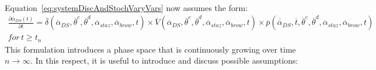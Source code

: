 \\Equation~\ref{eq:systemDiscAndStochVaryVars} now assumes the form:
\begin{equation}
\label{eq:systemDiscAndStochVaryVarsExpanded}
\begin{matrix}
\frac{\partial  \overline{\alpha }_{DS}\left ( t \right )}{\partial t}=  \overline{\delta}\left ( \overline{\alpha }_{DS}, \overline{\theta}^{c},\overline{\theta}^{d},\overline{\alpha}_{staz},\overline{\alpha}_{brow},t \right ) \times \overline{V}\left ( \overline{\alpha }_{DS}, \overline{\theta}^{c},\overline{\theta}^{d},\overline{\alpha}_{staz},\overline{\alpha}_{brow},t \right ) \times \overline{p}\left ( \overline{\overline{\alpha}}_{DS},\overline{t},\overline{\theta}^{c},\overline{\theta}^{d},\overline{\alpha}_{staz},\overline{\alpha}_{brow},t  \right ) \\ \! \! \! \! \! \! \! \! \! \! \! \! \! \! \! \! \! \! \! \! \! \! \! \! \! \! \! \! \! \! \! \! \! \! \! \! \! \! \! \! \! \! \! \! \! \! \! \! \! \! \! \! \! \! \! \! \! \! \! \! \! \! \! \! \! \! \! \! \! \! \! \! \! \! \! \! \! \! \! \! \! \! \! \! \! \! \! \! \! \! \! \! \! \! \! \! \! \! \! \! \! \! \! \! \! \! \! \! \! \! \! \! \! \! \! \! \! \! \! \! \! \! \! \! \! \! \! \! \! \! \! \! \! \! \! \! \! \! \! \! \! \! \! \! \! \! \! \! \! \! \! \! \! \! \! \! \! \! \! \! \! \! \! \! \! \! \! \!
for \, t\geq t_{n}
\end{matrix}
\end{equation}
This formulation introduces a phase space that is continuously growing over time $n \rightarrow \infty$. In this respect, it is useful to introduce and discuss possible assumptions:
